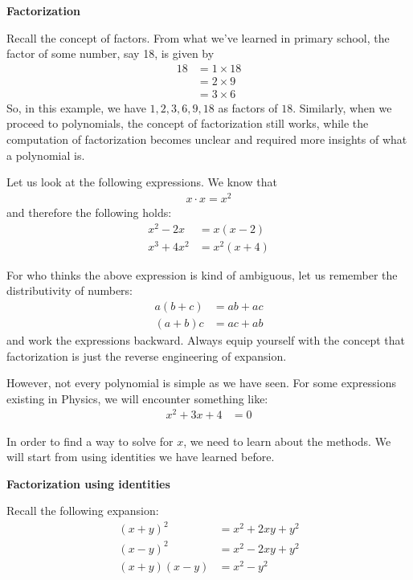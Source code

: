 \documentclass[12pt]{article}
\begin{document}
    \begin{center}
        \textbf{Factorization}
    \end{center}

    Recall the concept of factors. From what we've learned in primary school, the factor of some number, say 18, is given by \begin{align*}
        18&=1\times 18\\
        &=2\times 9\\
        &=3\times 6
    \end{align*}
    So, in this example, we have $1,2,3,6,9,18$ as factors of $18$. Similarly, when we proceed to polynomials, the concept of factorization still works, while the computation of factorization becomes unclear and required more insights of what a polynomial is.

    Let us look at the following expressions. We know that \begin{align*}
        x\cdot x=x^2
    \end{align*} and therefore the following holds:\begin{align*}
        x^2-2x&=x(x-2)\\
        x^3+4x^2&=x^2(x+4)
    \end{align*}

    For who thinks the above expression is kind of ambiguous, let us remember the distributivity of numbers:\begin{align*}
        a(b+c)&=ab+ac\\
        (a+b)c&=ac+ab
    \end{align*} and work the expressions backward. Always equip yourself with the concept that factorization is just the reverse engineering of expansion.

    However, not every polynomial is simple as we have seen. For some expressions existing in Physics, we will encounter something like:\begin{align*}
        x^2+3x+4&=0
    \end{align*}

    In order to find a way to solve for $x$, we need to learn about the methods. We will start from using identities we have learned before.

    \begin{center}
        \textbf{Factorization using identities}
    \end{center}

    Recall the following expansion:\begin{align*}
        (x+y)^2&=x^2+2xy+y^2\\
        (x-y)^2&=x^2-2xy+y^2\\
        (x+y)(x-y)&=x^2-y^2
    \end{align*}
\end{document}
